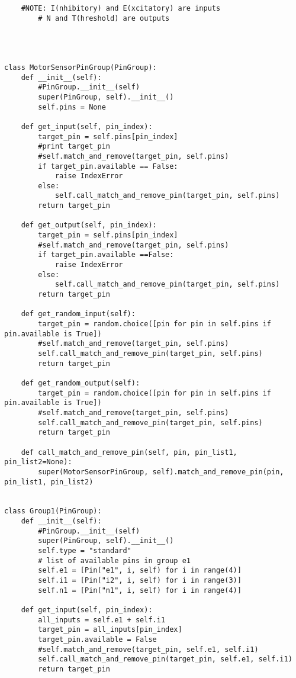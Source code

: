 \documentclass[a4paper]{article}
\begin{document}
\begin{verbatim}
    #NOTE: I(nhibitory) and E(xcitatory) are inputs
        # N and T(hreshold) are outputs




class MotorSensorPinGroup(PinGroup):
    def __init__(self):
        #PinGroup.__init__(self)
        super(PinGroup, self).__init__()
        self.pins = None

    def get_input(self, pin_index):
        target_pin = self.pins[pin_index]
        #print target_pin
        #self.match_and_remove(target_pin, self.pins)
        if target_pin.available == False:
            raise IndexError
        else:
            self.call_match_and_remove_pin(target_pin, self.pins)
        return target_pin

    def get_output(self, pin_index):
        target_pin = self.pins[pin_index]
        #self.match_and_remove(target_pin, self.pins)
        if target_pin.available ==False:
            raise IndexError
        else:
            self.call_match_and_remove_pin(target_pin, self.pins)
        return target_pin

    def get_random_input(self):
        target_pin = random.choice([pin for pin in self.pins if pin.available is True])
        #self.match_and_remove(target_pin, self.pins)
        self.call_match_and_remove_pin(target_pin, self.pins)
        return target_pin

    def get_random_output(self):
        target_pin = random.choice([pin for pin in self.pins if pin.available is True])
        #self.match_and_remove(target_pin, self.pins)
        self.call_match_and_remove_pin(target_pin, self.pins)
        return target_pin

    def call_match_and_remove_pin(self, pin, pin_list1, pin_list2=None):
        super(MotorSensorPinGroup, self).match_and_remove_pin(pin, pin_list1, pin_list2)


class Group1(PinGroup):
    def __init__(self):
        #PinGroup.__init__(self)
        super(PinGroup, self).__init__()
        self.type = "standard"
        # list of available pins in group e1
        self.e1 = [Pin("e1", i, self) for i in range(4)]
        self.i1 = [Pin("i2", i, self) for i in range(3)]
        self.n1 = [Pin("n1", i, self) for i in range(4)]

    def get_input(self, pin_index):
        all_inputs = self.e1 + self.i1
        target_pin = all_inputs[pin_index]
        target_pin.available = False
        #self.match_and_remove(target_pin, self.e1, self.i1)
        self.call_match_and_remove_pin(target_pin, self.e1, self.i1)
        return target_pin


\end{verbatim}
\end{document}
